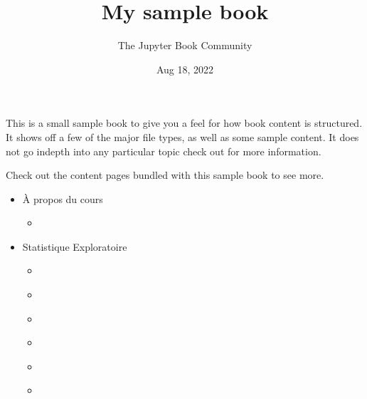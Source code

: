 \documentclass[letterpaper,10pt,english]{jupyterBook}
\title{My sample book}
\date{Aug 18, 2022}
\author{The Jupyter Book Community}
\begin{document}
\pagestyle{empty}
\sphinxmaketitle
\pagestyle{plain}
\sphinxtableofcontents
\pagestyle{normal}
\label{\detokenize{intro::doc}}


\sphinxAtStartPar
This is a small sample book to give you a feel for how book content is
structured.
It shows off a few of the major file types, as well as some sample content.
It does not go in\sphinxhyphen{}depth into any particular topic \sphinxhyphen{} check out  for more information.

\sphinxAtStartPar
Check out the content pages bundled with this sample book to see more.
\begin{itemize}
\item {} 
\sphinxAtStartPar
À propos du cours

\begin{itemize}
\item {} 
\sphinxAtStartPar
{\hyperref[\detokenize{Introduction::doc}]{}}

\end{itemize}
\end{itemize}
\begin{itemize}
\item {} 
\sphinxAtStartPar
Statistique Exploratoire

\begin{itemize}
\item {} 
\sphinxAtStartPar
{\hyperref[\detokenize{Statistiques_exploratoire/types_de_donn_xe9es::doc}]{}}

\item {} 
\sphinxAtStartPar
{\hyperref[\detokenize{Statistiques_exploratoire/graphiques::doc}]{}}

\item {} 
\sphinxAtStartPar
{\hyperref[\detokenize{Statistiques_exploratoire/synth_xe8ses_num_xe9riques::doc}]{}}

\item {} 
\sphinxAtStartPar
{\hyperref[\detokenize{Statistiques_exploratoire/boxplot::doc}]{}}

\item {} 
\sphinxAtStartPar
{\hyperref[\detokenize{Statistiques_exploratoire/loi_normale::doc}]{}}

\item {} 
\sphinxAtStartPar
{\hyperref[\detokenize{Statistiques_exploratoire/quelques_principes_g_xe9n_xe9raux::doc}]{}}

\end{itemize}
\end{itemize}
\end{document}
